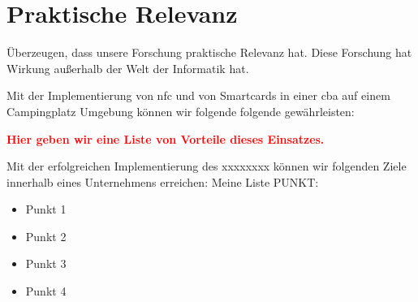 \section{Praktische Relevanz}

Überzeugen, dass unsere Forschung praktische Relevanz hat. Diese Forschung hat Wirkung außerhalb der
Welt der Informatik hat.

Mit der Implementierung von \acrshort{nfc} und von Smartcards in einer \acrlong{cba} auf einem Campingplatz Umgebung können
wir folgende folgende gewährleisten:

\textbf{\textcolor{red}{Hier geben wir eine Liste von Vorteile dieses Einsatzes.}}


Mit der erfolgreichen Implementierung des xxxxxxxx können wir folgenden Ziele innerhalb eines Unternehmens erreichen:
Meine Liste PUNKT:
\begin{itemize}
    \item Punkt 1
    \item Punkt 2
    \item Punkt 3
    \item Punkt 4
\end{itemize}

